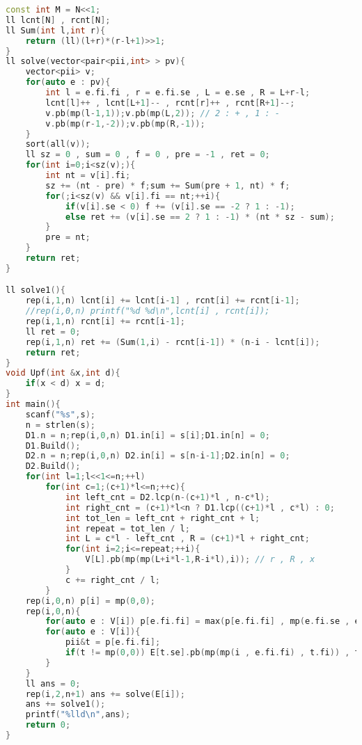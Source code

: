 \begin{lstlisting}[language=C++]
const int M = N<<1;
ll lcnt[N] , rcnt[N];
ll Sum(int l,int r){
    return (ll)(l+r)*(r-l+1)>>1;
}
ll solve(vector<pair<pii,int> > pv){
    vector<pii> v;
    for(auto e : pv){
        int l = e.fi.fi , r = e.fi.se , L = e.se , R = L+r-l;
        lcnt[l]++ , lcnt[L+1]-- , rcnt[r]++ , rcnt[R+1]--;
        v.pb(mp(l-1,1));v.pb(mp(L,2)); // 2 : + , 1 : -
        v.pb(mp(r-1,-2));v.pb(mp(R,-1));
    }
    sort(all(v));
    ll sz = 0 , sum = 0 , f = 0 , pre = -1 , ret = 0;
    for(int i=0;i<sz(v);){
        int nt = v[i].fi;
        sz += (nt - pre) * f;sum += Sum(pre + 1, nt) * f;
        for(;i<sz(v) && v[i].fi == nt;++i){
            if(v[i].se < 0) f += (v[i].se == -2 ? 1 : -1);
            else ret += (v[i].se == 2 ? 1 : -1) * (nt * sz - sum);
        }
        pre = nt;
    }
    return ret;
}

ll solve1(){
    rep(i,1,n) lcnt[i] += lcnt[i-1] , rcnt[i] += rcnt[i-1];
    //rep(i,0,n) printf("%d %d\n",lcnt[i] , rcnt[i]);
    rep(i,1,n) rcnt[i] += rcnt[i-1];
    ll ret = 0;
    rep(i,1,n) ret += (Sum(1,i) - rcnt[i-1]) * (n-i - lcnt[i]);
    return ret;
}
void Upf(int &x,int d){
    if(x < d) x = d;
}
int main(){
    scanf("%s",s);
    n = strlen(s);
    D1.n = n;rep(i,0,n) D1.in[i] = s[i];D1.in[n] = 0;
    D1.Build();
    D2.n = n;rep(i,0,n) D2.in[i] = s[n-i-1];D2.in[n] = 0;
    D2.Build();
    for(int l=1;l<<1<=n;++l)
        for(int c=1;(c+1)*l<=n;++c){
            int left_cnt = D2.lcp(n-(c+1)*l , n-c*l);
            int right_cnt = (c+1)*l<n ? D1.lcp((c+1)*l , c*l) : 0;
            int tot_len = left_cnt + right_cnt + l;
            int repeat = tot_len / l;
            int L = c*l - left_cnt , R = (c+1)*l + right_cnt;
            for(int i=2;i<=repeat;++i){
                V[L].pb(mp(mp(L+i*l-1,R-i*l),i)); // r , R , x
            }
            c += right_cnt / l;
        }
    rep(i,0,n) p[i] = mp(0,0);
    rep(i,0,n){
        for(auto e : V[i]) p[e.fi.fi] = max(p[e.fi.fi] , mp(e.fi.se , e.se));
        for(auto e : V[i]){
            pii&t = p[e.fi.fi];
            if(t != mp(0,0)) E[t.se].pb(mp(mp(i , e.fi.fi) , t.fi)) , t = mp(0,0); // l , r , L
        }
    }
    ll ans = 0;
    rep(i,2,n+1) ans += solve(E[i]);
    ans += solve1();
    printf("%lld\n",ans);
    return 0;
}
\end{lstlisting}
